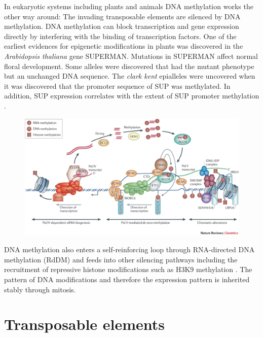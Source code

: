 In eukaryotic systems including plants and animals DNA methylation works the other way around: The invading transposable elements are silenced by DNA methylation. DNA methylation can block transcription and gene expression directly by interfering with the binding of transcription factors. One of the earliest evidences for epigenetic modifications in plants was discovered in the \textit{Arabidopsis thaliana} gene SUPERMAN. Mutations in SUPERMAN affect normal floral development. Some alleles were discovered that had the mutant phenotype but an unchanged DNA sequence. The \textit{clark kent} epialleles were uncovered when it was discovered that the promoter sequence of SUP was methylated. In addition, SUP expression correlates with the extent of SUP promoter methylation \citep{RN100}.

\begin{figure}[htbp!] 
\centering    
    \includegraphics[width=1\textwidth]{Chapter1/Figs/RdDM.png}
\caption{}
\label{fig:RdDM_overview}
\captionsetup{font=small}
    \caption*{}
\end{figure}




DNA methylation also enters a self-reinforcing loop through RNA-directed DNA methylation (RdDM) and feeds into other silencing pathways including the recruitment of repressive histone modifications such as H3K9 methylation \citep{RN206,RN98,RN99}. The pattern of DNA modifications and therefore the expression pattern is inherited stably through mitosis. 

\section{Transposable elements} %

